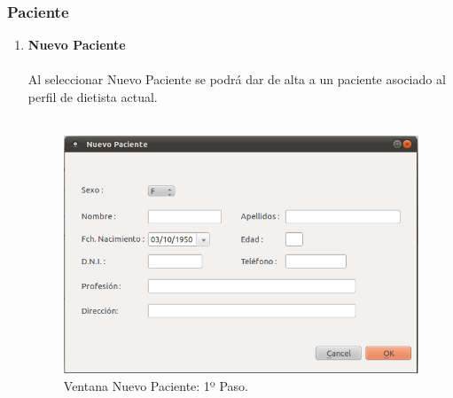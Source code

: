 \subsubsection{Paciente}
\begin{enumerate}
\item \textbf{Nuevo Paciente}\\\\
Al seleccionar Nuevo Paciente se podrá dar de alta a un paciente asociado al perfil de dietista actual.\\\\
\begin{figure}[H]
  \label{nuevo_paciente1}
  \begin{center}
    \includegraphics[scale=0.5]{../../Image/paciente-nuevo1.png}
  \end{center}
  \caption{Ventana Nuevo Paciente: 1º Paso.}
\end{figure}


\end{enumerate}
